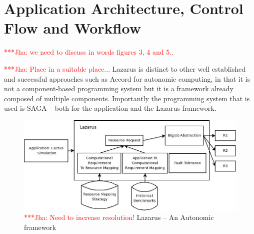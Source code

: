 \documentclass[conference,final]{IEEEtran}
\newcommand{\jhanote}[1]{ {\textcolor{red} { ***Jha: #1 }}}
\newcommand{\yyenote}[1]{ {\textcolor{blue} { ***yye00: #1 }}}
\newcommand{\jhanote}[1]{}
\newcommand{\yyenote}[1]{}
\begin{document}



\section{Application Architecture,  Control Flow and Workflow}

\jhanote{we need to discuss in words figures 3, 4 and 5..}



\jhanote{Place in a suitable place...}  Lazarus is distinct to other
well established and successful approaches such as Accord for
autonomic computing, in that it is not a component-based programming
system but it is a framework already composed of multiple
components. Importantly the programming system that is used is SAGA --
both for the application and the Lazarus framework.

\begin{figure}
\begin{center}
\includegraphics[scale=0.3]{./figures/Lazarus_01.jpeg}
\end{center}
\caption{\jhanote{Need to increase resolution!}  Lazarus -- An
  Autonomic framework}

\label{fig:application_architecture}
\end{figure}
\end{document}
